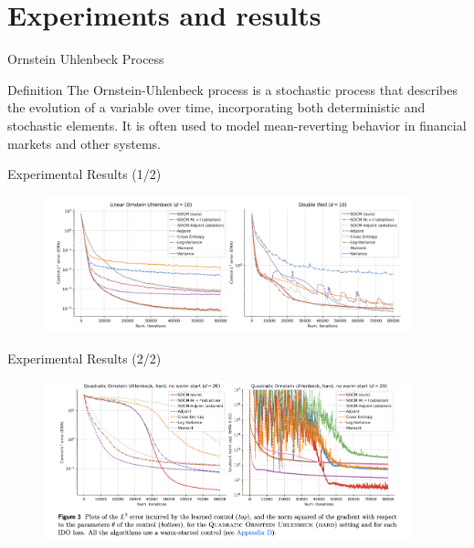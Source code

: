 \documentclass[aspectratio=169,xcolor=dvipsnames]{beamer}
\begin{document}


\section{Experiments and results}

\begin{frame}{Ornstein Uhlenbeck Process}
    \begin{block}{Definition}
        The Ornstein-Uhlenbeck process is a stochastic process that describes the evolution of a variable over time, incorporating both deterministic and stochastic elements. It is often used to model mean-reverting behavior in financial markets and other systems.
    \end{block}
\end{frame}

\begin{frame}{Experimental Results (1/2)}
    \begin{figure}
        \centering
        \includegraphics[width=0.95\textwidth]{figures/plots_1.png}
    \end{figure}
\end{frame}

\begin{frame}{Experimental Results (2/2)}
    \begin{figure}
        \centering
        \includegraphics[width=0.95\textwidth]{figures/plots_2.png}
    \end{figure}
\end{frame}
\end{document}
